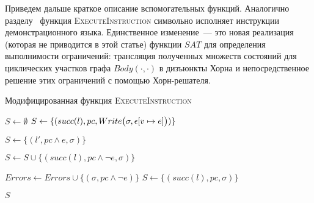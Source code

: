 Приведем дальше краткое описание вспомогательных функций.
Аналогично разделу~ функция \textsc{ExecuteInstruction} символьно исполняет инструкции демонстрационного языка. Единственное изменение~--- это новая реализация (которая не приводится в этой статье) функции $SAT$ для определения выполнимости ограничений: трансляция полученных множеств состояний для циклических участков графа $Body(\cdot,\cdot)$ в дизъюнкты Хорна и непосредственное решение этих ограничений с помощью Хорн-решателя.

\begin{algorithm}
    \caption{Модифицированная функция \textsc{ExecuteInstruction}} \label{new_execute_instruction}
\begin{algorithmic}[1]
        \State $S \gets \emptyset$
         \label{alg:execute_instruction_start}
                \State $S \gets \{(succ(l),pc, Write\big(\sigma,\epsilon[v\mapsto e]\big))\}$
            \EndCase

                 \label{alg:sat1}
                    \State $S \gets \{(l', pc \land e, \sigma)\}$
                \EndIf

                 \label{alg:sat2}
                    \State $S \gets S \cup \{(succ(l), pc \land \neg e, \sigma)\}$
                \EndIf
            \EndCase

                 \label{alg:sat3}
                    \State $Errors \gets Errors \cup \{(\sigma, pc \land \neg e)\}$
                \Else
                    \State $S \gets \{(succ(l),pc,\sigma)\}$
                \EndIf
            \EndCase

            \EndCase
        \EndSwitch \label{alg:execute_instruction_end}
        \State \Return $S$
    \EndProcedure
\end{algorithmic}
\end{algorithm}

